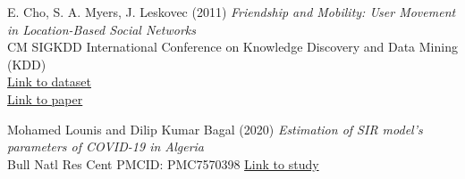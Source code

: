 \documentclass[a4paper]{article}
\begin{document}
\newpage
\begin{thebibliography}{9}

E. Cho, S. A. Myers, J. Leskovec (2011) \emph{Friendship and Mobility: User Movement in Location-Based Social Networks}\\
CM SIGKDD International Conference on Knowledge Discovery and Data Mining (KDD)\\
\href{http://snap.stanford.edu/data/loc-brightkite.html}{Link to dataset}\\
\href{https://cs.stanford.edu/people/jure/pubs/mobile-kdd11.pdf}{Link to paper}

Mohamed Lounis and Dilip Kumar Bagal (2020) \emph{Estimation of SIR model’s parameters of COVID-19 in Algeria}\\
Bull Natl Res Cent PMCID: PMC7570398
\href{https://www.ncbi.nlm.nih.gov/pmc/articles/PMC7570398/}{Link to study}
\end{thebibliography}
\end{document}
